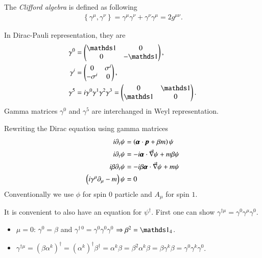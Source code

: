 The \textit{Clifford algebra} is defined as following
\begin{align}
   \left\{ \gamma^\mu, \gamma^\nu \right\} = \gamma^\mu \gamma^\nu + \gamma^\nu \gamma^\mu = 2 g^{\mu\nu}.
\end{align}

In Dirac-Pauli representation, they are
\begin{align}
   \gamma^0 &= \begin{pmatrix} \id & 0 \\ 0 & -\id \end{pmatrix}, \\
   \gamma^i &= \begin{pmatrix} 0 & \sigma^i \\ -\sigma^i & 0 \end{pmatrix}, \\
   \gamma^5 &= i \gamma^0 \gamma^1 \gamma^2 \gamma^3 = \begin{pmatrix} 0 & \id \\ \id & 0\end{pmatrix}.
\end{align}
Gamma matrices $\gamma^0$ and $\gamma^5$ are interchanged in Weyl representation.

Rewriting the Dirac equation using gamma matrices
\begin{align}
   i \partial_t \psi &= \left( \pmb{\alpha} \cdot \pmb{p} + \beta m  \right) \psi \notag\\
   i \partial_t \psi &= -i \pmb{\alpha} \cdot \vec{\nabla} \psi + m \beta \psi \notag\\
   i \beta \partial_t \psi &= -i \beta \pmb{\alpha} \cdot \vec{\nabla} \psi + m \psi \notag\\
   \left(i\gamma^\mu \partial_\mu - m \right) \psi &= 0
\end{align}
Conventionally we use $\phi$ for spin $0$ particle and $A_\mu$ for spin $1$.

It is convenient to also have an equation for $\psi^\dagger$. First one can show $\gamma^{\dagger\mu} = \gamma^0 \gamma^\mu \gamma^0$.
\begin{itemize}
   \item $\mu = 0$: $\gamma^0 = \beta$ and $\gamma^{\dagger\, 0} = \gamma^0 \gamma^0 \gamma^0$ $\Rightarrow \beta^2 = \id_4$.
   \item $\gamma^{\dagger\mu} = (\beta \alpha^k)^\dagger = (\alpha^k)^\dagger \beta^\dagger = \alpha^k \beta = \beta^2 \alpha^k \beta = \beta \gamma^k \beta = \gamma^0 \gamma^k \gamma^0$.
\end{itemize}

